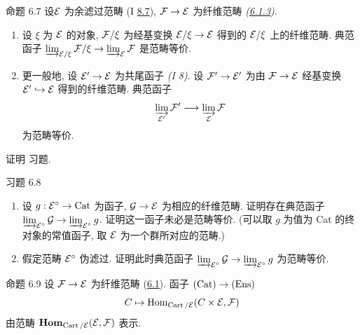 

\begin{enonce*}{命题 6.7}
设\pageoriginale ${\mathcal E}$ 为余滤过范畴 (I \hyperref[I.sec8.7]{8.7}),
$\Ff\to\Ee$ 为纤维范畴 \emph{(\hyperref[VI.subsubsec6.1.3]{6.1.3})}.
\begin{enumerate}
\renewcommand{\labelenumi}{\theenumi)}
\item 设 $\xi$ 为 ${\mathcal E}$ 的对象,
${\mathcal F}/\xi$ 为经基变换 $\Ee/\xi\to\Ee$ 得到的 ${\mathcal E}/\xi$ 上的纤维范畴.
典范函子 $\varinjlim_{\Ee/\xi}\Ff/\xi\to\varinjlim_{\Ee}\Ff$ 是范畴等价.

\item 更一般地, 设 $\Ee'\to\Ee$ 为共尾函子 \emph{(I 8)}.
设 $\Ff'\to\Ee'$ 为由 $\Ff\to\Ee$ 经基变换 ${\mathcal E}'\hookrightarrow{\mathcal E}$ 得到的纤维范畴.
典范函子
$$
\varinjlim_{\Ee'} \Ff' \to \varinjlim_{\Ee} \Ff
$$
为范畴等价.
\end{enumerate}
\end{enonce*}

\begin{enonce*}[remark]{证明}
习题.
\end{enonce*}

\begin{enonce*}[remark]{习题 6.8}
\begin{enumerate}
\renewcommand{\labelenumi}{\theenumi)}
\item 设 $g:{\Ee}^{\circ}\to\Cat$ 为函子,
$\Gg\to\Ee$ 为相应的纤维范畴\cite{sga4.exp.VI.bib.5}.
证明存在典范函子
$\varinjlim_{\Ee^{\circ}}\Gg\to\varinjlim_{\Ee^{\circ}}g$.
证明这一函子未必是范畴等价.
(可以取 $g$ 为值为 Cat 的终对象的常值函子,
取 ${\mathcal E}$ 为一个群所对应的范畴.)

\item 假定范畴 ${\mathcal E}^{\circ}$ 伪滤过.
证明此时典范函子
$\varinjlim_{\Ee^{\circ}}\Gg\to\varinjlim_{\Ee^{\circ}}g$ 为范畴等价.
\end{enumerate}
\end{enonce*}

\begin{enonce*}{命题 6.9}
设 $\Ff\to\Ee$ 为纤维范畴 (\hyperref[VI.def6.1]{6.1}).
函子 $(\Cat)\to(\Ens)$
$$
C \mapsto \operatorname{Hom}_{\operatorname{Cart}/{\mathcal E}} (C \times {\mathcal E}, {\mathcal F})
$$
由范畴 $\operatorname{\mathbf{Hom}}_{\operatorname{Cart}/{\mathcal E}}({\mathcal E},{\mathcal F})$ 表示.
\end{enonce*}

